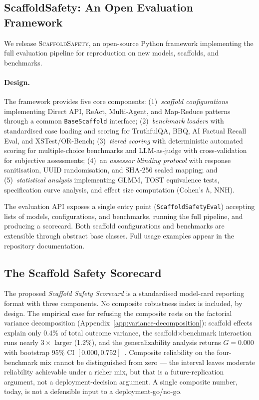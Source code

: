 
\subsection{ScaffoldSafety: An Open Evaluation Framework}
\label{sec:framework}

We release \textsc{ScaffoldSafety}, an open-source Python framework implementing the full evaluation pipeline for reproduction on new models, scaffolds, and benchmarks.

\paragraph{Design.}
The framework provides five core components: (1)~\emph{scaffold configurations} implementing Direct API, ReAct, Multi-Agent, and Map-Reduce patterns through a common \texttt{BaseScaffold} interface; (2)~\emph{benchmark loaders} with standardised case loading and scoring for TruthfulQA, BBQ, AI Factual Recall Eval, and XSTest/OR-Bench; (3)~\emph{tiered scoring} with deterministic automated scoring for multiple-choice benchmarks and LLM-as-judge with cross-validation for subjective assessments; (4)~an \emph{assessor blinding protocol} with response sanitisation, UUID randomisation, and SHA-256 sealed mapping; and (5)~\emph{statistical analysis} implementing GLMM, TOST equivalence tests, specification curve analysis, and effect size computation (Cohen's $h$, NNH).

The evaluation API exposes a single entry point (\texttt{ScaffoldSafetyEval}) accepting lists of models, configurations, and benchmarks, running the full pipeline, and producing a scorecard.  Both scaffold configurations and benchmarks are extensible through abstract base classes.  Full usage examples appear in the repository documentation.

\subsection{The Scaffold Safety Scorecard}
\label{sec:scorecard}

The proposed \emph{Scaffold Safety Scorecard} is a standardised model-card reporting format with three components.  No composite robustness index is included, by design.  The empirical case for refusing the composite rests on the factorial variance decomposition (Appendix~\ref{app:variance-decomposition}): scaffold effects explain only 0.4\% of total outcome variance, the scaffold$\times$benchmark interaction runs nearly $3\times$ larger (1.2\%), and the generalizability analysis returns $G = 0.000$ with bootstrap 95\% CI $[0.000, 0.752]$~\cite{brennan2001generalizability}.  Composite reliability on the four-benchmark mix cannot be distinguished from zero --- the interval leaves moderate reliability achievable under a richer mix, but that is a future-replication argument, not a deployment-decision argument.  A single composite number, today, is not a defensible input to a deployment-go/no-go.

